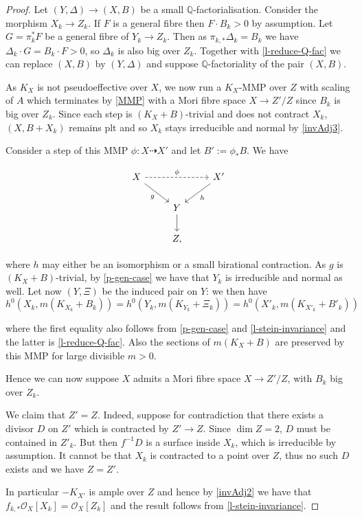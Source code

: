 \documentclass[a4paper,12pt]{book}
\newcommand{\ox}{\mathcal{O}_{X}}
\begin{document}
	\begin{proof}
		Let $(Y, \Delta) \to (X, B)$ be a small $\mathbb{Q}$-factorialisation. 
		Consider the morphism $X_{k} \to Z_{k}$. If $F$ is a general fibre then $F \cdot B_{k} > 0$ by assumption. Let $G=\pi^{*}_{k}F$ be a general fibre of $Y_{k} \to Z_{k}$. Then as $\pi_{k,*}\Delta_{k}=B_{k}$ we have $\Delta_{k} \cdot G=B_{k}\cdot F > 0$, so $\Delta_{k}$ is also big over $Z_{k}$. Together with \autoref{l-reduce-Q-fac} we can replace $(X,B)$ by $(Y,\Delta)$ and suppose $\mathbb{Q}$-factoriality of the pair $(X,B)$.
		
		As $K_X$ is not pseudoeffective over $X$, we now run a $K_{X}$-MMP over $Z$ with scaling of $A$ which terminates by \autoref{MMP} with a Mori fibre space $X \to Z'/Z$ since $B_k$ is big over $Z_k$. 
		Since each step is $(K_{X}+B)$-trivial and does not contract $X_{k}$, $(X,B+X_{k})$ remains plt and so $X_{k}$ stays irreducible and normal by \autoref{invAdj3}.
		
		Consider a step of this MMP $\phi \colon X \dashrightarrow X'$ and let $B':=\phi_*B$.  We have
		
		\[\begin{tikzcd}
			X \arrow[swap, rd, "g"] \arrow[rr, "\phi", dashed] &                 & X' \arrow[ld, "h"] \\
			& Y \arrow[d] &                        \\
			& Z ,         &                       
		\end{tikzcd}\]

where $h$ may either be an isomorphism or a small birational contraction. As $g$ is $(K_X+B)$-trivial, by \autoref{p-gen-case} we have that $Y_k$ is irreducible and normal as well. Let now $(Y,\Xi)$ be the induced pair on $Y$: we then have
		$$h^{0}(X_{k},m(K_{X_k}+B_{k}))=h^{0}(Y_{k},m(K_{Y_{k}}+\Xi_k))=h^{0}(X'_{k},m(K_{X'_k}+B'_{k}))$$ 
		
		where the first equality also follows from \autoref{p-gen-case} and \autoref{l-stein-invariance} and the latter is \autoref{l-reduce-Q-fac}. Also the sections of $m(K_{X}+B)$ are preserved by this MMP for large divisible $m > 0$.
		
		Hence we can now suppose $X$ admits a Mori fibre space $X \to Z'/Z$, with $B_{k}$ big over $Z_{k}$.
		
		We claim that $Z'=Z$.
		Indeed, suppose for contradiction that there exists a divisor $D$ on $Z'$ which is contracted by $Z' \to Z$. Since $\dim Z=2$, $D$ must be contained in $Z'_k$. But then $f^{-1}D$ is a surface inside $X_{k}$, which is irreducible by assumption. It cannot be that $X_{k}$ is contracted to a point over $Z$, thus no such $D$ exists and we have $Z=Z'$.
		
		In particular $-K_{X'}$ is ample over $Z$ and hence by \autoref{invAdj2} we have that $f_{k,*} \ox[X_{k}]=\ox[Z_{k}]$ and the result follows from \autoref{l-stein-invariance}.
	\end{proof}
	
\end{document}
